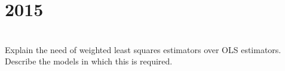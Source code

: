 \section*{2015}
\vspace{-.5cm}
\hrulefill \smallskip\\
 Explain the need of weighted least squares estimators over OLS estimators. Describe the models in which this is required.